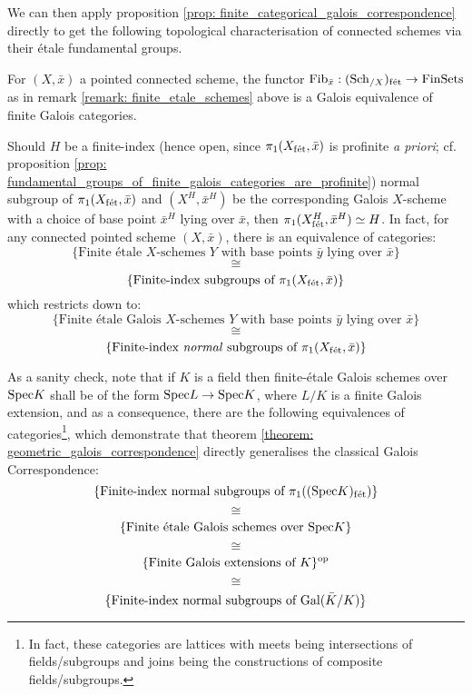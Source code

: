             We can then apply proposition \ref{prop: finite_categorical_galois_correspondence} directly to get the following topological characterisation of connected schemes via their \'etale fundamental groups.
            \begin{theorem} \label{theorem: geometric_galois_correspondence}
                For $(X, \bar{x})$ a pointed connected scheme, the functor $\mathrm{Fib}_{\bar{x}}: (\mathrm{Sch}_{/X})_{\mathrm{f\acute{e}t}} \to \mathrm{Fin}\mathrm{Sets}$ as in remark \ref{remark: finite_etale_schemes} above is a Galois equivalence of finite Galois categories. 
            \end{theorem}
            \begin{corollary}
                Should $H$ be a finite-index (hence open, since $\pi_1(X_{\mathrm{f\acute{e}t}}, \bar{x})$ is profinite \textit{a priori}; cf. proposition \ref{prop: fundamental_groups_of_finite_galois_categories_are_profinite}) normal subgroup of $\pi_1(X_{\mathrm{f\acute{e}t}}, \bar{x})$ and $(X^H, \bar{x}^H)$ be the corresponding Galois $X$-scheme with a choice of base point $\bar{x}^H$ lying over $\bar{x}$, then $\pi_1(X^H_{\mathrm{f\acute{e}t}}, \bar{x}^H) \simeq H$. In fact, for any connected pointed scheme $(X, \bar{x})$, there is an equivalence of categories:
                    $$\{\text{Finite \'etale $X$-schemes $Y$ with base points $\bar{y}$ lying over $\bar{x}$}\}$$
                    $$\cong$$
                    $$\{\text{Finite-index subgroups of $\pi_1(X_{\mathrm{f\acute{e}t}}, \bar{x})$}\}$$
                which restricts down to:
                    $$\{\text{Finite \'etale Galois $X$-schemes $Y$ with base points $\bar{y}$ lying over $\bar{x}$}\}$$
                    $$\cong$$
                    $$\{\text{Finite-index \textit{normal} subgroups of $\pi_1(X_{\mathrm{f\acute{e}t}}, \bar{x})$}\}$$
            \end{corollary}
            \begin{example} \label{example: etale_fundamental_group_of_a_field}
                As a sanity check, note that if $K$ is a field then finite-\'etale Galois schemes over $\mathrm{Spec} K$ shall be of the form $\mathrm{Spec} L \to \mathrm{Spec} K$, where $L/K$ is a finite Galois extension, and as a consequence, there are the following equivalences of categories\footnote{In fact, these categories are lattices with meets being intersections of fields/subgroups and joins being the constructions of composite fields/subgroups.}, which demonstrate that theorem \ref{theorem: geometric_galois_correspondence} directly generalises the classical Galois Correspondence:
                    $$\{\text{Finite-index normal subgroups of $\pi_1((\mathrm{Spec} K)_{\mathrm{f\acute{e}t}})$}\}$$
                    $$\cong$$
                    $$\{\text{Finite \'etale Galois schemes over $\mathrm{Spec} K$}\}$$
                    $$\cong$$
                    $$\{\text{Finite Galois extensions of $K$}\}^{\mathrm{op}}$$
                    $$\cong$$
                    $$\{\text{Finite-index normal subgroups of $\mathrm{Gal}(\bar{K}/K)$}\}$$
            \end{example}
